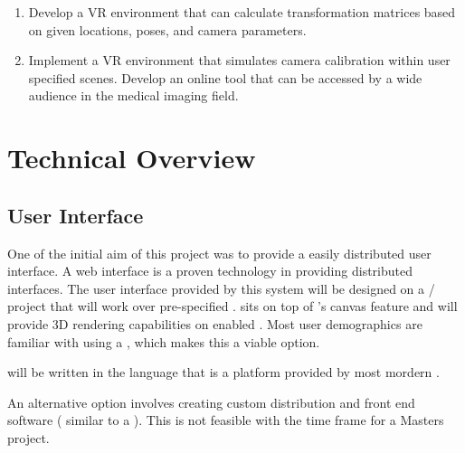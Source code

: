 \documentclass[11pt]{report}
\begin{document}
\begin{enumerate}
\item Develop a VR environment that can calculate transformation matrices based on given locations, poses, and camera parameters.  
\item Implement a VR environment that simulates camera calibration within user specified scenes. Develop an online tool that can be accessed by a wide audience in the medical imaging field.
\end{enumerate}

\section{Technical Overview}

\subsection{User Interface}




One of the initial aim of this project was to provide a easily distributed user interface. A web interface is a proven technology in providing distributed interfaces. The user interface provided by this system will be designed on a / project that will work over pre-specified .  sits on top of 's canvas feature and will provide 3D rendering capabilities on enabled . Most user demographics are familiar with using a , which makes this a viable option. 

 will be written in the  language that is a platform provided by most mordern . 

An alternative option involves creating custom distribution and front end software ( similar to a  ). This is not feasible with the time frame for a Masters project. 
\end{document}
